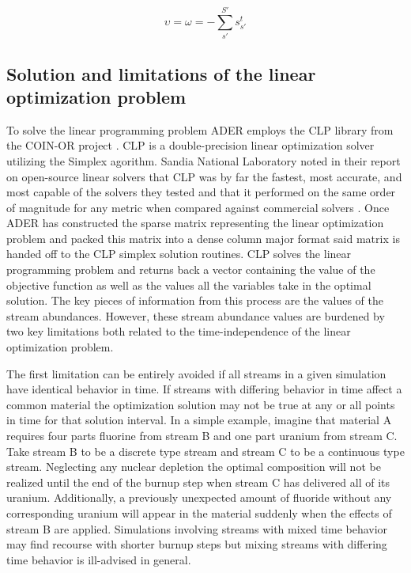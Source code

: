 \begin{equation}
\label{eq:upsilon_bound}
\upsilon = \omega = -\sum \limits_{s'}^{S'} s_{s'}^{t}
\end{equation}




\subsection{Solution and limitations of the linear optimization problem} \label{ssec:sol}
To solve the linear programming problem ADER employs the
CLP library from the COIN-OR project \cite{lougee-heimer_common_2003}. 
CLP is a double-precision linear optimization solver utilizing the Simplex 
agorithm. Sandia National Laboratory noted in their report on open-source
linear solvers that CLP was by far the fastest, most accurate, and most
capable of the solvers they tested and that it performed on the same
order of magnitude for any metric when compared against commercial solvers
\cite{gearhart_comparison_2013}.
Once ADER has constructed the
sparse matrix representing the linear optimization problem
and packed this matrix into a dense column major format said
matrix is handed off to the CLP simplex solution routines. 
CLP solves the linear programming problem and returns back a
vector containing the value of the objective function as well as the values
all the variables take in the optimal solution. The key pieces of information 
from this process are the values of the stream abundances. However, these
stream abundance values are burdened by two key limitations both related to the
time-independence of the linear optimization problem. 

The first limitation can be entirely avoided if all streams in a given
simulation have identical behavior in time. If streams with differing behavior
in time affect a common material the optimization solution may not be true at
any or all points in time for that solution interval. In a simple example,
imagine that material A requires four parts fluorine from stream B and one part
uranium from stream C. Take stream B to be a discrete type stream and stream C
to be a continuous type stream. Neglecting any nuclear depletion the optimal
composition will not be realized until the end of the burnup step when stream C
has delivered all of its uranium. Additionally, a previously unexpected amount
of fluoride without any corresponding uranium will appear in the material 
suddenly when the effects of stream B are applied.
Simulations involving streams with mixed time
behavior may find recourse with shorter burnup steps but mixing streams with
differing time behavior is ill-advised in general.

